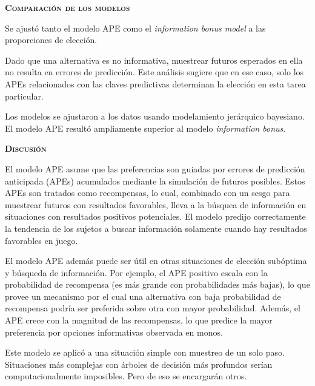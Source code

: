 \documentclass[a4paper,12pt]{article}
\begin{document}
{\scshape\bfseries Comparación de los modelos}

Se ajustó tanto el modelo APE como el {\itshape information bonus model} a las proporciones de elección.

Dado que una alternativa es no informativa, muestrear futuros esperados en ella no resulta en errores de predicción. Este análisis sugiere que en ese caso, solo los APEs relacionados con las claves predictivas determinan la elección en esta tarea particular. 

Los modelos se ajustaron a los datos usando modelamiento jerárquico bayesiano. El modelo APE resultó ampliamente superior al modelo {\itshape information bonus}.

{\scshape\bfseries Discusión}

El modelo APE asume que las preferencias son guiadas por errores de predicción anticipada (APEs) acumulados mediante la simulación de futuros posibles. Estos APEs son tratados como recompensas, lo cual, combinado con un sesgo para muestrear futuros con resultados favorables, lleva a la búsquea de información en situaciones con resultados positivos potenciales. El modelo predijo correctamente la tendencia de los sujetos a buscar información solamente cuando hay resultados favorables en juego.

El modelo APE además puede ser útil en otras situaciones de elección subóptima y búsqueda de información. Por ejemplo, el APE positivo escala con la probabilidad de recompensa (es más grande con probabilidades más bajas), lo que provee un mecanismo por el cual una alternativa con baja probabilidad de recompensa podría ser preferida sobre otra con mayor probabilidad. Además, el APE crece con la magnitud de las recompensas, lo que predice la mayor preferencia por opciones informativas observada en monos. 

Este modelo se aplicó a una situación simple con muestreo de un solo paso. Situaciones más complejas con árboles de decisión más profundos serían computacionalmente imposibles. Pero de eso se encargarán otros.
\end{document}
